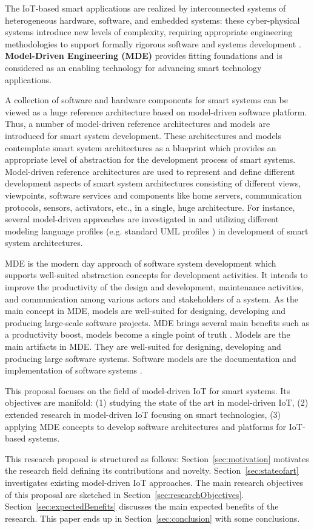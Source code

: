 The IoT-based smart applications are realized by interconnected systems of heterogeneous hardware, software, and embedded systems: these cyber-physical systems introduce new levels of complexity, requiring appropriate engineering methodologies to support formally rigorous software and systems development \cite{Kuryazov+2018+1}. \textbf{Model-Driven Engineering (MDE)} provides fitting foundations and is considered as an enabling technology for advancing smart technology applications.

A collection of software and hardware components for smart systems can be viewed as a huge reference architecture based on model-driven software platform. Thus, a number of model-driven reference architectures \cite{KateuleWinter2018} and models \cite{Yin+2015} are introduced for smart system development. These architectures and models contemplate smart system architectures as a blueprint which provides an appropriate level of abstraction for the development process of smart systems. Model-driven reference architectures are used to represent and define different development aspects of smart system architectures consisting of different views, viewpoints, software services and components like home servers, communication protocols, sensors, activators, etc., in a single, huge architecture. For instance, several model-driven approaches are investigated in \cite{Corredor+2012} and \cite{KleanthisFoivos2016} utilizing different modeling language profiles (e.g. standard UML profiles \cite{Rumbaugh+2004}) in development of smart system architectures.

MDE is the modern day approach of software system development which supports well-suited abstraction concepts for development activities. It intends to improve the productivity of the design and development, maintenance activities, and communication among various actors and stakeholders of a system. As the main concept in MDE, models are well-suited for designing, developing and producing large-scale software projects. MDE brings several main benefits such as a productivity boost, models become a single point of truth \cite{Fleurey+2011}. Models are the main artifacts in MDE. They are well-suited for designing, developing and producing large software systems. Software models are the documentation and implementation of software systems \cite{Kleppe+2003}.

This proposal focuses on the field of model-driven IoT for smart systems. Its objectives are manifold: (1) studying the state of the art in model-driven IoT, (2) extended research in model-driven IoT focusing on smart technologies, (3) applying MDE concepts to develop software architectures and platforms for IoT-based systems.

This research proposal is structured as follows: Section~\ref{sec:motivation} motivates the research field defining its contributions and novelty. Section~\ref{sec:stateofart} investigates existing model-driven IoT approaches. The main research objectives of this proposal are sketched in Section~\ref{sec:researchObjectives}. Section~\ref{sec:expectedBenefits} discusses the main expected benefits of the research. This paper ends up in Section~\ref{sec:conclusion} with some conclusions.